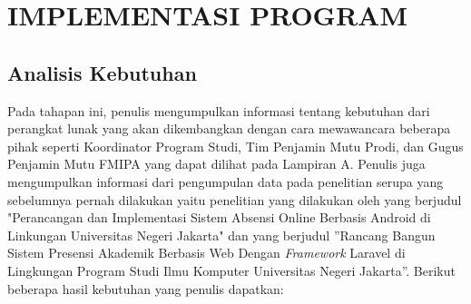 
\chapter{IMPLEMENTASI PROGRAM}


\section{Analisis Kebutuhan }
Pada tahapan ini, penulis mengumpulkan informasi tentang kebutuhan dari perangkat lunak yang akan dikembangkan dengan cara mewawancara beberapa pihak seperti Koordinator Program Studi, Tim Penjamin Mutu Prodi, dan Gugus Penjamin Mutu FMIPA yang dapat dilihat pada Lampiran A. Penulis juga mengumpulkan informasi dari pengumpulan data pada penelitian serupa yang sebelumnya pernah dilakukan yaitu penelitian yang dilakukan oleh \cite{FitriAndiniMedIrzal2017} yang berjudul "Perancangan dan Implementasi Sistem Absensi Online Berbasis Android di Linkungan Universitas Negeri Jakarta"  dan \cite{Kultsum2021} yang berjudul ''Rancang Bangun Sistem Presensi Akademik Berbasis Web Dengan \textit{Framework} Laravel di Lingkungan Program Studi Ilmu Komputer Universitas Negeri Jakarta''. Berikut beberapa hasil kebutuhan yang penulis dapatkan:

